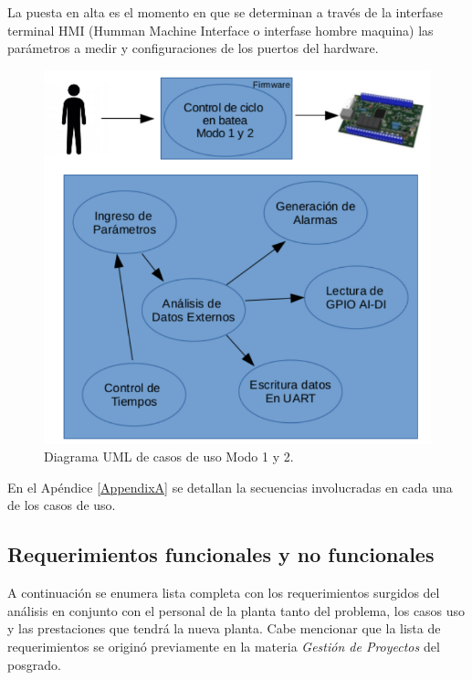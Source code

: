 La puesta en alta es el momento en que se determinan a través de la interfase terminal HMI (Humman Machine Interface o interfase hombre maquina) las parámetros a medir y configuraciones de los puertos del hardware.

\begin{figure}[h!]
	\centering
	\includegraphics[width=.8\textwidth]{Figures/Cap_2/caso_uso_Marcha_UML}
	\caption{Diagrama UML de casos de uso Modo 1 y 2.}
	\label{fig:casodeUso1y2}
\end{figure}

En el Apéndice \ref{AppendixA} se detallan la secuencias involucradas en cada una de los casos de uso.

\subsection{ Requerimientos funcionales y no funcionales }
\label{subsec:Requerimientos}

A continuación se enumera lista completa con los requerimientos surgidos del análisis en conjunto con el personal de la planta tanto del problema, los casos uso y las prestaciones que tendrá la nueva planta. 
Cabe mencionar que la lista de requerimientos se originó previamente en la materia \emph{Gestión de Proyectos} del posgrado.

